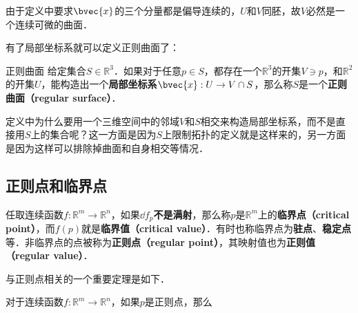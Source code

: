 由于定义中要求$\bvec{x}$的三个分量都是偏导连续的，$U$和$V$同胚，故$V$必然是一个连续可微的曲面．

有了局部坐标系就可以定义正则曲面了：

\begin{definition}{正则曲面}
给定集合$S\in\mathbb{R}^3$．如果对于任意$p\in S$，都存在一个$\mathbb{R}^3$的开集$V\ni p$，和$\mathbb{R}^2$的开集$U$，能构造出一个\textbf{局部坐标系}$\bvec{x}:U\to V\cap S$，那么称$S$是一个\textbf{正则曲面（regular surface）}．
\end{definition}

定义中为什么要用一个三维空间中的邻域$V$和$S$相交来构造局部坐标系，而不是直接用$S$上的集合呢？这一方面是因为$S$上限制拓扑的定义就是这样来的，另一方面是因为这样可以排除掉曲面和自身相交等情况．

\subsection{正则点和临界点}

\begin{definition}{}
任取连续函数$f:\mathbb{R}^m\to\mathbb{R}^n$，如果$\dd f_p$\textbf{不是满射}，那么称$p$是$\mathbb{R}^m$上的\textbf{临界点（critical point）}，而$f(p)$就是\textbf{临界值（critical value）}．有时也称临界点为\textbf{驻点}、\textbf{稳定点}等．非临界点的点被称为\textbf{正则点（regular point）}，其映射值也为\textbf{正则值（regular value）}．
\end{definition}

与正则点相关的一个重要定理是如下．

\begin{theorem}{}
对于连续函数$f:\mathbb{R}^m\to\mathbb{R}^n$，如果$p$是正则点，那么
\end{theorem}



